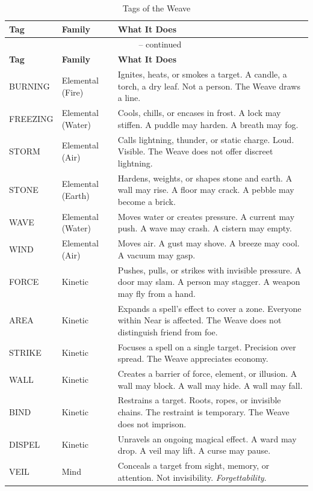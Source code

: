 \noindent
\begin{longtable}{p{} p{} p{}}
\caption{Tags of the Weave}\\
\midrule
\textbf{Tag} & \textbf{Family} & \textbf{What It Does}\\
\midrule
\endfirsthead
\multicolumn{3}{c}{\tablename\ \thetable{} -- continued}\\
\midrule
\textbf{Tag} & \textbf{Family} & \textbf{What It Does}\\
\midrule
\endhead
BURNING & Elemental (Fire) & Ignites, heats, or smokes a target. A candle, a torch, a dry leaf. Not a person. The Weave draws a line. \\
FREEZING & Elemental (Water) & Cools, chills, or encases in frost. A lock may stiffen. A puddle may harden. A breath may fog. \\
STORM & Elemental (Air) & Calls lightning, thunder, or static charge. Loud. Visible. The Weave does not offer discreet lightning. \\
STONE & Elemental (Earth) & Hardens, weights, or shapes stone and earth. A wall may rise. A floor may crack. A pebble may become a brick. \\
WAVE & Elemental (Water) & Moves water or creates pressure. A current may push. A wave may crash. A cistern may empty. \\
WIND & Elemental (Air) & Moves air. A gust may shove. A breeze may cool. A vacuum may gasp. \\
FORCE & Kinetic & Pushes, pulls, or strikes with invisible pressure. A door may slam. A person may stagger. A weapon may fly from a hand. \\
AREA & Kinetic & Expands a spell's effect to cover a zone. Everyone within Near is affected. The Weave does not distinguish friend from foe. \\
STRIKE & Kinetic & Focuses a spell on a single target. Precision over spread. The Weave appreciates economy. \\
WALL & Kinetic & Creates a barrier of force, element, or illusion. A wall may block. A wall may hide. A wall may fall. \\
BIND & Kinetic & Restrains a target. Roots, ropes, or invisible chains. The restraint is temporary. The Weave does not imprison. \\
DISPEL & Kinetic & Unravels an ongoing magical effect. A ward may drop. A veil may lift. A curse may pause. \\
VEIL & Mind & Conceals a target from sight, memory, or attention. Not invisibility. \emph{Forgettability}. \\

\end{longtable}
